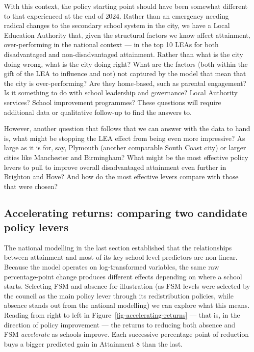 \documentclass[
  11pt,
]{article}
\begin{document}
With this context, the policy starting point should have been somewhat
different to that experienced at the end of 2024. Rather than an
emergency needing radical changes to the secondary school system in the
city, we have a Local Education Authority that, given the structural
factors we know affect attainment, over-performing in the national
context --- in the top 10 LEAs for both disadvantaged and
non-disadvantaged attainment. Rather than what is the city doing wrong,
what is the city doing right? What are the factors (both within the gift
of the LEA to influence and not) not captured by the model that mean
that the city is over-performing? Are they home-based, such as parental
engagement? Is it something to do with school leadership and governance?
Local Authority services? School improvement programmes? These questions
will require additional data or qualitative follow-up to find the
answers to.

However, another question that follows that we can answer with the data
to hand is, what might be stopping the LEA effect from being even more
impressive? As large as it is for, say, Plymouth (another comparable
South Coast city) or larger cities like Manchester and Birmingham? What
might be the most effective policy levers to pull to improve overall
disadvantaged attainment even further in Brighton and Hove? And how do
the most effective levers compare with those that were chosen?

\subsection{Accelerating returns: comparing two candidate policy
levers}\label{accelerating-returns-comparing-two-candidate-policy-levers}

The national modelling in the last section established that the
relationships between attainment and most of its key school-level
predictors are non-linear. Because the model operates on log-transformed
variables, the same raw percentage-point change produces different
effects depending on where a school starts. Selecting FSM and absence
for illustration (as FSM levels were selected by the council as the main
policy lever through its redistribution policies, while absence stands
out from the national modelling) we can explore what this means. Reading
from right to left in Figure~\ref{fig-accelerating-returns} --- that is,
in the direction of policy improvement --- the returns to reducing both
absence and FSM \emph{accelerate} as schools improve. Each successive
percentage point of reduction buys a bigger predicted gain in Attainment
8 than the last.
\end{document}
